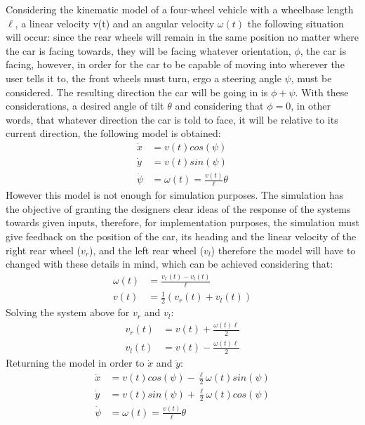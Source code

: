 Considering the kinematic model of a four-wheel vehicle with a wheelbase length $\ell$, a linear velocity v(t) and an angular velocity $\omega(t)$ the following situation will occur: since the rear wheels will remain in the same position no matter where the car is facing towards, they will be facing whatever orientation, $\phi$, the car is facing, however, in order for the car to be capable of moving into wherever the user tells it to, the front wheels must turn, ergo a steering angle $\psi$, must be considered. The resulting direction the car will be going in is $\phi + \psi$. With these considerations, a desired angle of tilt $\theta$ and considering that $\phi=0$, in other words, that whatever direction the car is told to face, it will be relative to its current direction, the following model is obtained:
\begin{align}
\dot{x}&=v(t) cos(\psi)\\
\dot{y}&=v(t) sin(\psi)\\
\dot{\psi}&=\omega(t)=\frac{v(t)}{\ell}\theta
\end{align}
However this model is not enough for simulation purposes. The simulation has the objective of granting the designers clear ideas of the response of the systems towards given inputs, therefore, for implementation purposes, the simulation must give feedback on the position of the car, its heading and the linear velocity of the right rear wheel ($v_r$), and the left rear wheel ($v_l$) therefore the model will have to changed with these details in mind, which can be achieved considering that:
\begin{align}
\omega(t)&=\frac{v_r(t)-v_l(t)}{\ell}\\
v(t)&=\frac{1}{2}(v_r(t)+v_l(t))
\end{align}
Solving the system above for $v_r$ and $v_l$:
\begin{align}
v_ r(t)&=v(t)+ \frac{\omega(t)\ell}{2}\\
v_l(t)&=v(t)-\frac{\omega(t)\ell}{2}
\end{align}
Returning the model in order to $\dot{x}$ and $ \dot{y}$:
\begin{align}
\dot{x}&=v(t) cos(\psi)-\frac{\ell}{2}\omega(t) sin(\psi)\\
\dot{y}&=v(t) sin(\psi)+\frac{\ell}{2}\omega(t) cos(\psi)\\
\dot{\psi}&=\omega(t)=\frac{v(t)}{\ell}\theta
\end{align}
